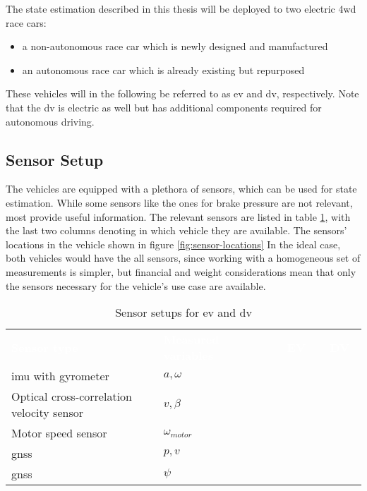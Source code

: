 The state estimation described in this thesis will be deployed to two electric \gls{4wd} race cars:
\begin{itemize}
\item a non-autonomous race car which is newly designed and manufactured
\item an autonomous race car which is already existing but repurposed
\end{itemize}
These vehicles will in the following be referred to as \gls{ev} and \gls{dv}, respectively. Note that the \gls{dv} is electric as well but has additional components required for autonomous driving.

\subsection{Sensor Setup}
The vehicles are equipped with a plethora of sensors, which can be used for state estimation. While some sensors like the ones for brake pressure are not relevant, most provide useful information. The relevant sensors are listed in table \ref{tab:sensor}, with the last two columns denoting in which vehicle they are available. The sensors' locations in the vehicle shown in figure \ref{fig:sensor-locations} In the ideal case, both vehicles would have the all sensors, since working with a homogeneous set of measurements is simpler, but financial and weight considerations mean that only the sensors necessary for the vehicle's use case are available.

\begin{table}[h]
	\newcommand\heading[1]{\textcolor{white}{\textbf{#1}}}
	\renewcommand{\arraystretch}{1.2}
	\sffamily
	\centering
	\begin{tabularx}{\textwidth}{X l c c}
	\rowcolor{black} \heading{Sensor type} & \heading{Measured variables~~~} & \heading{~EV~} & \heading{~DV~} \vspace{2pt} \\
	\Glsdesc{imu} with gyrometer & $a, \omega$ & \xmark & \xmark \\
	Optical cross-correlation velocity sensor & $v, \beta$ & \xmark &  \\
	Motor speed sensor & $\omega_{motor}$ & \xmark & \xmark \\
	\Glsdesc{gnss} & $p, v$ & \xmark & \xmark \\
	\Glsdesc{gnss} & $\psi$ &  & \xmark \\
	\end{tabularx}
	\caption{Sensor setups for \gls{ev} and \gls{dv}}
	\label{tab:sensor}
\end{table}

